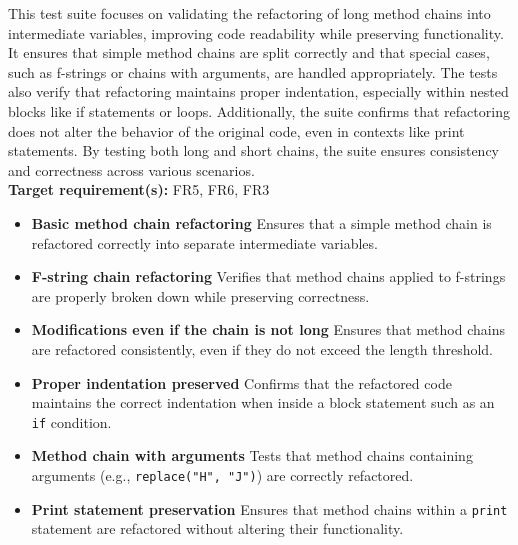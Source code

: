 \documentclass[12pt, titlepage]{article}
\begin{document}
\begin{enumerate}[label={\bf \textcolor{Maroon}{test-SRT-\arabic*}}, wide=0pt, font=\itshape]
\noindent This test suite focuses on validating the refactoring of long method chains into 
intermediate variables, improving code readability while preserving functionality. 
It ensures that simple method chains are split correctly and that special cases, 
such as f-strings or chains with arguments, are handled appropriately. The tests 
also verify that refactoring maintains proper indentation, especially within nested 
blocks like if statements or loops. Additionally, the suite confirms that 
refactoring does not alter the behavior of the original code, even in contexts 
like print statements. By testing both long and short chains, the suite ensures 
consistency and correctness across various scenarios.\\

\noindent \textbf{Target requirement(s):} FR5, FR6, FR3 ~\cite{SRS} \\

\begin{itemize}
    \item \textbf{Basic method chain refactoring} \newline
    Ensures that a simple method chain is refactored correctly into separate intermediate variables.

    \item \textbf{F-string chain refactoring} \newline
    Verifies that method chains applied to f-strings are properly broken down while preserving correctness.

    \item \textbf{Modifications even if the chain is not long} \newline
    Ensures that method chains are refactored consistently, even if they do not exceed the length threshold.

    \item \textbf{Proper indentation preserved} \newline
    Confirms that the refactored code maintains the correct indentation when inside a block statement such as an \texttt{if} condition.

    \item \textbf{Method chain with arguments} \newline
    Tests that method chains containing arguments (e.g., \texttt{replace("H", "J")}) are correctly refactored.

    \item \textbf{Print statement preservation} \newline
    Ensures that method chains within a \texttt{print} statement are refactored without altering their functionality.


\end{itemize}
\end{enumerate}
\end{document}
